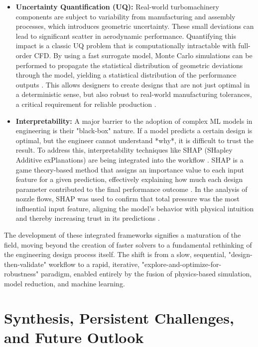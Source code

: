 \documentclass[dsc, EN]{ufabcFHZh}
\begin{document}
\begin{itemize}
    \item \textbf{Uncertainty Quantification (UQ):} Real-world turbomachinery components are subject to variability from manufacturing and assembly processes, which introduces geometric uncertainty. These small deviations can lead to significant scatter in aerodynamic performance. Quantifying this impact is a classic UQ problem that is computationally intractable with full-order CFD. By using a fast surrogate model, Monte Carlo simulations can be performed to propagate the statistical distribution of geometric deviations through the model, yielding a statistical distribution of the performance outputs \citep{synthesized2024}. This allows designers to create designs that are not just optimal in a deterministic sense, but also robust to real-world manufacturing tolerances, a critical requirement for reliable production \citep{Research_progress_on_uncertainty_effect}.
    \item \textbf{Interpretability:} A major barrier to the adoption of complex ML models in engineering is their "black-box" nature. If a model predicts a certain design is optimal, but the engineer cannot understand *why*, it is difficult to trust the result. To address this, interpretability techniques like SHAP (SHapley Additive exPlanations) are being integrated into the workflow \citep{lundberg2017unified, molnar2022interpretable}. SHAP is a game theory-based method that assigns an importance value to each input feature for a given prediction, effectively explaining how much each design parameter contributed to the final performance outcome \citep{lundberg2017unified, molnar2022interpretable, SHAP_intro}. In the analysis of nozzle flows, SHAP was used to confirm that total pressure was the most influential input feature, aligning the model's behavior with physical intuition and thereby increasing trust in its predictions \citep{synthesized2024}.
\end{itemize}

The development of these integrated frameworks signifies a maturation of the field, moving beyond the creation of faster solvers to a fundamental rethinking of the engineering design process itself. The shift is from a slow, sequential, "design-then-validate" workflow to a rapid, iterative, "explore-and-optimize-for-robustness" paradigm, enabled entirely by the fusion of physics-based simulation, model reduction, and machine learning.

\section{Synthesis, Persistent Challenges, and Future Outlook}
\end{document}

